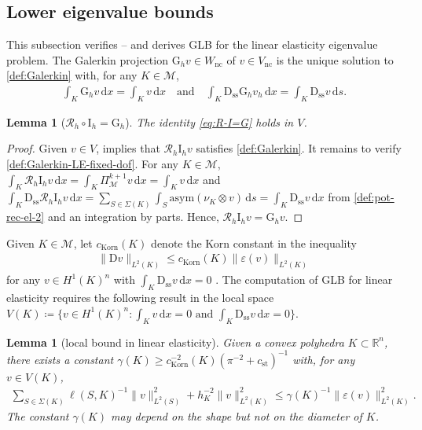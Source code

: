 \documentclass[a4paper]{amsart}
\numberwithin{equation}{section}
\newcommand{\R}{\mathbb{R}}
\renewcommand{\d}[1]{\,\mathrm{d}#1}
\newcommand{\I}{\mathrm{I}}
\newcommand{\D}{\mathrm{D}}
\newcommand{\Mcal}{\mathcal{M}}
\newtheorem{lemma}[theorem]{Lemma}
\theoremstyle{remark}
\theoremstyle{definition}
\theoremstyle{assumptionnoperiod}
\begin{document}
\subsection{Lower eigenvalue bounds}\label{sec:lower-eig-bounds-LE}
This subsection verifies -- and derives GLB for the linear elasticity eigenvalue problem.
The Galerkin projection $\mathrm{G}_h v \in W_\mathrm{nc}$ of $v \in V_\mathrm{nc}$ is the unique solution to \eqref{def:Galerkin} with, for any $K \in \Mcal$,
\begin{align}\label{def:Galerkin-LE-fixed-dof}
	\int_K \mathrm{G}_h v \d{x} = \int_K v \d{x} \quad\text{and}\quad \int_K \D_\mathrm{ss} \mathrm{G}_h v_h \d{x} = \int_K \D_\mathrm{ss} v \d{s}.
\end{align}
\begin{lemma}[$\mathcal{R}_h \circ \I_h = \mathrm{G}_h$]\label{lem:RI=G-linear-elasticity}
	The identity \eqref{eq:R-I=G} holds in $V$.
\end{lemma}
\begin{proof}
	Given $v \in V$,  implies that $\mathcal{R}_h \I_h v$ satisfies \eqref{def:Galerkin}. 
	It remains to verify \eqref{def:Galerkin-LE-fixed-dof}.
	For any $K \in \Mcal$, $\int_K \mathcal{R}_h \I_h v \d{x} = \int_K \Pi_\Mcal^{k+1} v \d{x} = \int_K v \d{x}$ and $\int_K \D_\mathrm{ss} \mathcal{R}_h \I_h v \d{x} = \sum_{S \in \Sigma(K)} \int_S \mathrm{asym}(\nu_K \otimes v) \d{s} = \int_K \D_\mathrm{ss} v \d{x}$ from \eqref{def:pot-rec-el-2} and an integration by parts. Hence, $\mathcal{R}_h \I_h v = \mathrm{G}_h v$.
\end{proof}
Given $K \in \Mcal$, let $c_\mathrm{Korn}(K)$ denote the Korn constant in the inequality
\begin{align}\label{ineq:Korn}
	\|\D v\|_{L^2(K)} \leq c_\mathrm{Korn}(K)\|\varepsilon(v)\|_{L^2(K)}
\end{align}
for any $v \in H^1(K)^n$ with $\int_K \D_\mathrm{ss} v \d{x} = 0$ \cite{Brenner2004}. The computation of GLB for linear elasticity requires the following result in the local space $V(K) \coloneqq \{v \in H^1(K)^n : \int_K v \d{x} = 0 \text{ and } \int_K \D_\mathrm{ss} v \d{x} = 0\}$.
\begin{lemma}[local bound in linear elasticity]\label{lem:comp-emb-le}
	Given a convex polyhedra $K \subset \R^n$, there exists a constant $\gamma(K) \geq c_\mathrm{Korn}^{-2}(K)(\pi^{-2} + c_\mathrm{st})^{-1}$ with, for any $v \in V(K)$,
	\begin{align*}
		\sum_{S \in \Sigma(K)} \ell(S,K)^{-1}\|v\|_{L^2(S)}^2 + h_K^{-2}\|v\|_{L^2(K)}^2 \leq \gamma(K)^{-1} \|\varepsilon(v)\|^2_{L^2(K)}.
	\end{align*}
	The constant $\gamma(K)$ may depend on the shape but not on the diameter of $K$.
\end{lemma}
\end{document}
